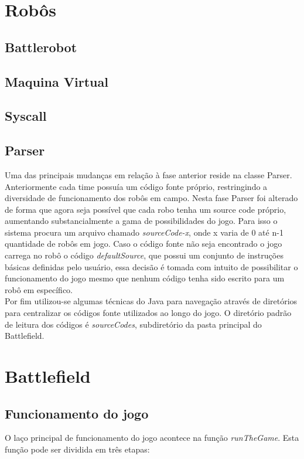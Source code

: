 \documentclass[a4paper]{article}
\begin{document}
\section{Robôs}
\subsection{Battlerobot}
\subsection{Maquina Virtual}
\subsection{Syscall}
\subsection{Parser}

Uma das principais mudanças em relação à fase anterior reside na classe Parser. Anteriormente cada time possuía um código fonte próprio, restringindo a diversidade de funcionamento dos robôs em campo. Nesta fase Parser foi alterado de forma que agora seja possível que cada robo tenha um source code próprio, aumentando substancialmente a gama de possibilidades do jogo. Para isso o sistema procura um arquivo chamado \textit{sourceCode-x}, onde x varia de 0 até n-1 quantidade de robôs em jogo. Caso o código fonte não seja encontrado o jogo carrega no robô o código \textit{defaultSource}, que possui um conjunto de instruções básicas definidas pelo usuário, essa decisão é tomada com intuito de possibilitar o funcionamento do jogo mesmo que nenhum código tenha sido escrito para um robô em específico.\\
Por fim utilizou-se algumas técnicas do Java para navegação através de diretórios para centralizar os códigos fonte utilizados ao longo do jogo. O diretório padrão de leitura dos códigos é \textit{sourceCodes}, subdiretório da pasta principal do Battlefield.




\section{Battlefield}
\subsection{Funcionamento do jogo}
O laço principal de funcionamento do jogo acontece na função \textit{runTheGame}. Esta função pode ser dividida em três etapas:
\end{document}
